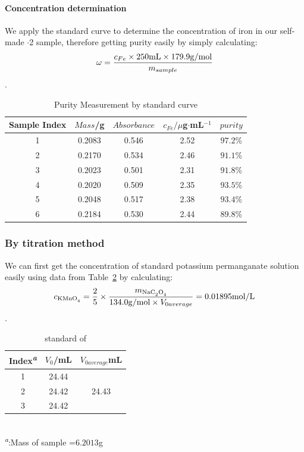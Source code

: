 \paragraph{Concentration determination}
We apply the standard curve to determine the concentration of iron in our self-made $\cdot$2 sample, therefore getting purity easily by simply calculating: \[\omega=\frac{c_{Fe}\times250{\rm mL}\times179.9{\rm g/mol}}{m_{sample}}\].

\begin{table}[H]
	\caption{Purity Measurement by standard curve}
	\label{tab.Pcurve}
	\begin{tabular}{ccccc}
	\toprule
	Sample Index  &$Mass$/g & $Absorbance$ &$c_{Fe}/\mu$g$\cdot$mL$^{-1}$& $purity$   \\
	\midrule
	1		&0.2083 & 0.546      & 2.52   &$97.2\%$  \\
	2		&0.2170 & 0.534      & 2.46   &$91.1\%$  \\
	3		&0.2023 & 0.501      & 2.31   &$91.8\%$  \\
	4		&0.2020 & 0.509      & 2.35   &$93.5\%$  \\
	5		&0.2048 & 0.517      & 2.38   &$93.4\%$  \\
	6		&0.2184 & 0.530      & 2.44   &$89.8\%$  \\
	\bottomrule
	\end{tabular}
\end{table}

\subsubsection{By titration method}

We can first get the concentration of standard potassium permanganate solution easily using data from Table~\ref{tab.CalMn} by calculating: \[c_{\ce{KMnO4}}=\frac{2}{5}\times\frac{m_{\ce{NaC2O4}}}{134.0{\rm g/mol}\times V_{0average}}=0.01895{\rm mol/L}\].

\begin{table}[H]
	\caption{standard of }
	\label{tab.CalMn}
	\begin{tabular}{ccc}
	\toprule
	Index\textsuperscript{\emph{a}}&$V_0$/mL&$V_{0average}$mL\\
	\midrule
	1    & 24.44 &\\
	2    & 24.42 & 24.43\\
	3    & 24.42 &\\
	\bottomrule
	\end{tabular}\\
	\textsuperscript{\emph{a}}:Mass of sample =$6.2013$g
\end{table}

